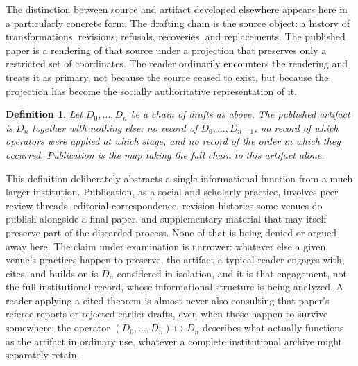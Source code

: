 \documentclass[11pt]{article}
\newtheorem{definition}{Definition}
\begin{document}
The distinction between source and artifact developed elsewhere appears here in a particularly concrete form. The drafting chain is the source object: a history of transformations, revisions, refusals, recoveries, and replacements. The published paper is a rendering of that source under a projection that preserves only a restricted set of coordinates. The reader ordinarily encounters the rendering and treats it as primary, not because the source ceased to exist, but because the projection has become the socially authoritative representation of it.

\begin{definition}
Let $D_0, \ldots, D_n$ be a chain of drafts as above. The \emph{published artifact} is $D_n$ together with nothing else: no record of $D_0, \ldots, D_{n-1}$, no record of which operators were applied at which stage, and no record of the order in which they occurred. \emph{Publication} is the map taking the full chain to this artifact alone.
\end{definition}

This definition deliberately abstracts a single informational function from a much larger institution. Publication, as a social and scholarly practice, involves peer review threads, editorial correspondence, revision histories some venues do publish alongside a final paper, and supplementary material that may itself preserve part of the discarded process. None of that is being denied or argued away here. The claim under examination is narrower: whatever else a given venue's practices happen to preserve, the artifact a typical reader engages with, cites, and builds on is $D_n$ considered in isolation, and it is that engagement, not the full institutional record, whose informational structure is being analyzed. A reader applying a cited theorem is almost never also consulting that paper's referee reports or rejected earlier drafts, even when those happen to survive somewhere; the operator $(D_0, \ldots, D_n) \mapsto D_n$ describes what actually functions as the artifact in ordinary use, whatever a complete institutional archive might separately retain.
\end{document}
